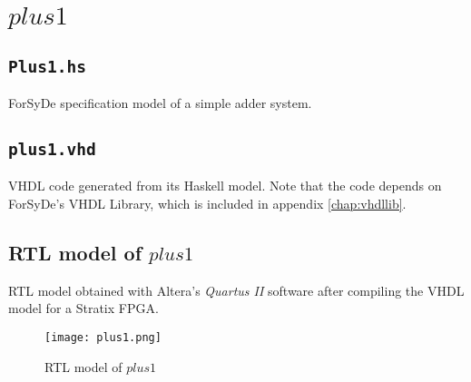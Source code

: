 \section{$\mathit{plus1}$}

\subsection{\texttt{Plus1.hs}}
ForSyDe specification model of a simple adder system.
 

\clearpage
\subsection{\texttt{plus1.vhd}}
VHDL code generated from its Haskell model. Note that the code depends
on ForSyDe's VHDL Library, which is included in appendix
\ref{chap:vhdllib}.


\newpage
\subsection{RTL model of $\mathit{plus1}$}
RTL model obtained with Altera's \textit{Quartus II} software after
compiling the VHDL model for a Stratix FPGA.

\begin{figure}[h]
\centering
\texttt{[image: plus1.png]}
\caption{RTL model of $\mathit{plus1}$}
\end{figure}
